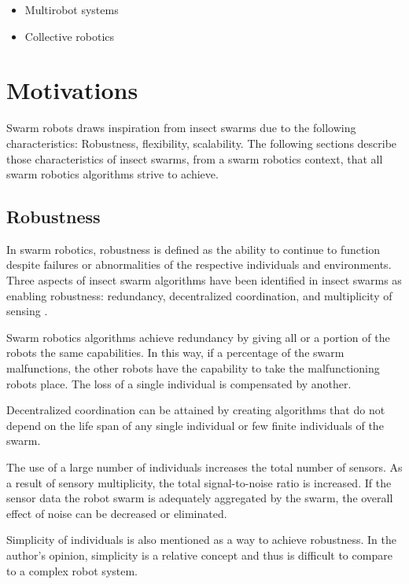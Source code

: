 



\begin{itemize}
\item Multirobot systems
\item Collective robotics
\end{itemize}

\section{Motivations}
\label{sec:first:advantages}


Swarm robots draws inspiration from insect swarms due to the following characteristics: Robustness, flexibility, scalability. The following sections describe those characteristics of insect swarms, from a swarm robotics context, that all swarm robotics algorithms strive to achieve. 

\subsection{Robustness}
\label{robustness}

In swarm robotics, robustness is defined as the ability to continue to function despite failures or abnormalities of the respective individuals and environments. Three aspects of insect swarm algorithms have been identified  in insect swarms as enabling robustness: redundancy, decentralized coordination, and multiplicity of sensing \cite{csahin2005swarm}.

Swarm robotics algorithms achieve redundancy by giving all or a portion of the robots the same capabilities. In this way, if a percentage  of the swarm malfunctions, the other robots have the capability to take the malfunctioning robots place. The loss of a single individual is compensated by another.

Decentralized coordination can be attained by creating algorithms that do not depend on the life span of any single individual or few finite individuals of the swarm.

The use of a large number of individuals increases the total number of sensors.  As a result of sensory multiplicity, the total signal-to-noise ratio is increased. If the sensor data the robot swarm is adequately aggregated by the swarm, the overall effect of noise can be decreased or eliminated. 

Simplicity of individuals is also mentioned as a way to achieve robustness. In the author's opinion, simplicity is a relative concept and thus is difficult to compare to a complex robot system. 

